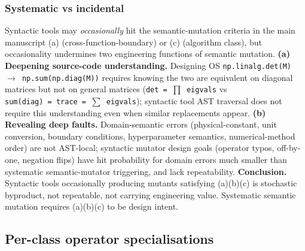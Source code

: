 \documentclass[review,12pt,authoryear]{elsarticle}
\begin{document}
\subsubsection{Systematic vs incidental}\label{b.1.5-systematic-vs-incidental}

Syntactic tools may \emph{occasionally} hit the semantic-mutation criteria in the main manuscript (a)
(cross-function-boundary) or (c) (algorithm class), but occasionality
undermines two engineering functions of semantic mutation. \textbf{(a)
Deepening source-code understanding.} Designing OS
\texttt{np.linalg.det(M)\ $\to$\ np.sum(np.diag(M))} requires knowing the
two are equivalent on diagonal matrices but not on general matrices
(\texttt{det\ =\ $\prod$\ eigvals} vs
\texttt{sum(diag)\ =\ trace\ =\ $\sum$\ eigvals}); syntactic tool AST
traversal does not require this understanding even when similar
replacements appear. \textbf{(b) Revealing deep faults.}
Domain-semantic errors (physical-constant, unit conversion, boundary
conditions, hyperparameter semantics, numerical-method order) are not
AST-local; syntactic mutator design goals (operator typos, off-by-one,
negation flips) have hit probability for domain errors much smaller than
systematic semantic-mutator triggering, and lack repeatability.
\textbf{Conclusion.} Syntactic tools occasionally producing mutants
satisfying (a)(b)(c) is stochastic byproduct, not repeatable, not
carrying engineering value. Systematic semantic mutation requires
(a)(b)(c) to be design intent.

\subsection{Per-class operator specialisations}\label{b.2-per-class-operator-specialisations}
\end{document}

